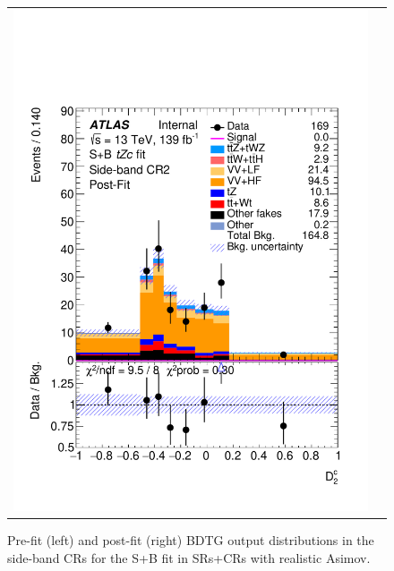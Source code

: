 \begin{figure}[htbp]
\begin{tabular}{cc}
		\includegraphics[width=.45\textwidth]{Appendices/AP8/figures/SPLUSB_CRSR_UsingSMTFullSys/Plots/SBCR2_postFit} \\
	\end{tabular}
	\caption{Pre-fit (left) and post-fit (right) BDTG output distributions in the side-band CRs for the S+B \tZc fit in SRs+CRs with realistic Asimov.
		\ErrStatSys
	}%
	\label{fig:stat_smt:tzc:splusb:crsr:crplots:1}
\end{figure}

